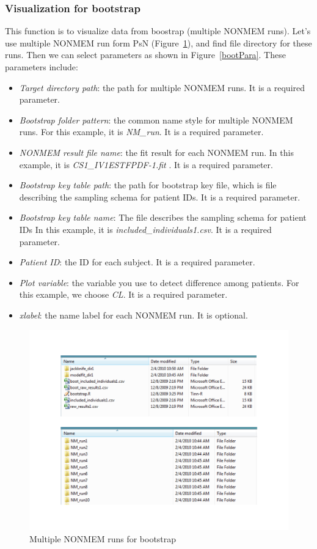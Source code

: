 \documentclass[a4paper]{article}
\begin{document}
\subsubsection{Visualization for bootstrap}
This function is to visualize data from boostrap (multiple NONMEM runs). Let's use multiple NONMEM run form PsN (Figure~\ref{bootData}), and find file directory for these runs. Then we can select parameters as shown in Figure~\ref{bootPara}.  These parameters include:
\begin{itemize}
	\item \textit{Target directory path}: the path for multiple NONMEM runs. It is a required parameter.
	\item \textit{Bootstrap folder pattern}: the common name style for multiple NONMEM runs. For this example, it is \textit{NM\_run}. It is a required parameter.
	\item \textit{NONMEM result file name}: the fit result for each NONMEM run. In this example, it is \textit{CS1\_IV1ESTFPDF-1.fit }. It is a required parameter.
	\item \textit{Bootstrap key table path}: the path for bootstrap key file, which is file describing the sampling schema for patient IDs. It is a required parameter.
	\item \textit{Bootstrap key table name}: The file describes the sampling schema for patient IDs In this example, it is \textit{included\_individuals1.csv}. It is a required parameter.
	\item \textit{Patient ID}: the ID for each subject. It is a required parameter.
	\item \textit{Plot variable}: the variable you use to detect difference among patients. For this example, we choose \textit{CL}. It is a required parameter.
	\item \textit{xlabel}: the name label for each NONMEM run. It is optional.
\end{itemize}
\begin{figure}[h!tb] \centering
\includegraphics[scale=0.6]{bootData.pdf}
\caption{Multiple NONMEM runs for bootstrap}
\label{bootData}
\end{figure}
\end{document}

